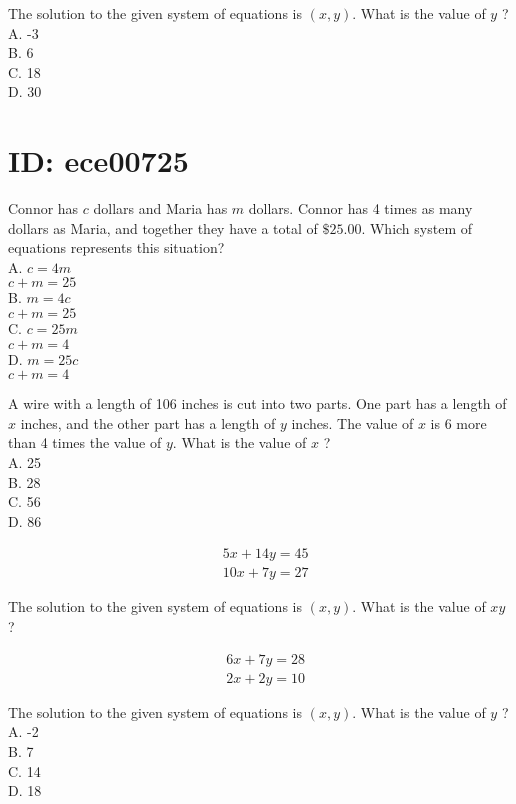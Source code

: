 The solution to the given system of equations is $(x, y)$. What is the value of $y$ ?\\
A. -3\\
B. 6\\
C. 18\\
D. 30

\section*{ID: ece00725}
Connor has $c$ dollars and Maria has $m$ dollars. Connor has 4 times as many dollars as Maria, and together they have a total of $\$ 25.00$. Which system of equations represents this situation?\\
A. $c=4 m$\\
$c+m=25$\\
B. $m=4 c$\\
$c+m=25$\\
C. $c=25 m$\\
$c+m=4$\\
D. $m=25 c$\\
$c+m=4$

A wire with a length of 106 inches is cut into two parts. One part has a length of $x$ inches, and the other part has a length of $y$ inches. The value of $x$ is 6 more than 4 times the value of $y$. What is the value of $x$ ?\\
A. 25\\
B. 28\\
C. 56\\
D. 86

$$
\begin{aligned}
& 5 x+14 y=45 \\
& 10 x+7 y=27
\end{aligned}
$$

The solution to the given system of equations is $(x, y)$. What is the value of $x y$ ?

$$
\begin{aligned}
& 6 x+7 y=28 \\
& 2 x+2 y=10
\end{aligned}
$$

The solution to the given system of equations is $(x, y)$. What is the value of $y$ ?\\
A. -2\\
B. 7\\
C. 14\\
D. 18

